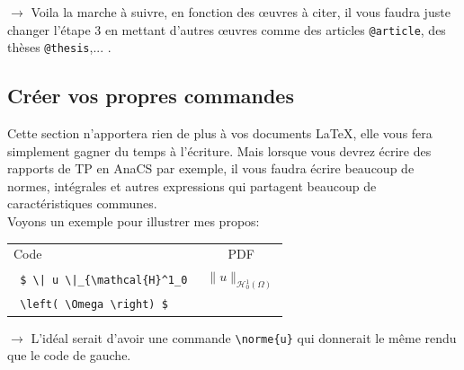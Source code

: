 \documentclass[11pt]{article}				%
\begin{document}
\begin{figure}[h!]
	\centering
	 \hfill

\end{figure}

$\rightarrow$ Voila la marche à suivre, en fonction des œuvres à citer, il vous faudra juste changer l'étape 3 en mettant d'autres œuvres comme des articles \verb|@article|, des thèses \verb|@thesis|,... . 

\newpage

\subsection*{Créer vos propres commandes}

Cette section n'apportera rien de plus à vos documents LaTeX, elle vous fera simplement gagner du temps à l'écriture. Mais lorsque vous devrez écrire des rapports de TP en AnaCS par exemple, il vous faudra écrire beaucoup de normes, intégrales et autres expressions qui partagent beaucoup de caractéristiques communes.\\

Voyons un exemple pour illustrer mes propos:\\


\begin{multicols}{2}
	\begin{tabular}{l|c}
Code	&  PDF \\ 
\verb? $ \| u \|_{\mathcal{H}^1_0 ? &  \( \| u \|_{\mathcal{H}^1_0 \left( \Omega \right) } \)  \\
	\verb? \left( \Omega \right) $?   &  
\end{tabular}

\columnbreak

$\rightarrow$ L'idéal serait d'avoir une commande \verb|\norme{u}| qui donnerait le même rendu que le code de gauche.
\end{multicols} 
\end{document}
